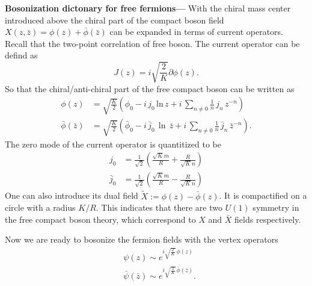 \documentclass[submission, PhysLectNotes]{SciPost}
\begin{document}
{\bf Bosonization dictonary for free fermions---}
With the chiral mass center introduced above the chiral part of the compact boson field $X(z,\bar{z}) = \phi(z) + \bar{\phi}(\bar{z})$ can be expanded in terms of current operators. Recall that the two-point correlation of free boson. The current operator can be defind as 
\begin{equation}
	J(z) = i\sqrt{\frac{2}{K}}\partial \phi (z).
\end{equation} 
So that the chiral/anti-chiral part of the free compact boson can be written as 
\begin{equation}
	\begin{split}
		\phi(z) &= \sqrt{\frac{K}{2}}\left(\phi_0 -i\,j_0\,\mathrm{ln}\,z + i\,\sum_{n\neq0} \frac{1}{n}\,j_n\,z^{-n}\right) \\
		\bar{\phi}(\bar{z}) &= \sqrt{\frac{K}{2}} \left(\bar{\phi}_0 -i\,\bar{j}_0\,\ln \,\bar{z} + i\,\sum_{n\neq0} \frac{1}{n}\,\bar{j}_n\,{\bar{z}}^{-n}\right).
	\end{split}
\end{equation} 
The zero mode of the current operator is quantitized to be 
\begin{equation}
	\begin{aligned}
		j_0 &= \frac{1}{\sqrt{2}} \left( \frac{\sqrt{K}m}{R} + \frac{R}{\sqrt{K}n} \right) \\
		\bar{j}_0 &= \frac{1}{\sqrt{2}} \left( \frac{\sqrt{K}m}{R} - \frac{R}{\sqrt{K}n} \right)
	\end{aligned}
\end{equation}
One can also introduce its dual field $\tilde{X} := \phi(z) - \bar{\phi}(z)$. It is compactified on a circle with a radius $K/R$. This indicates that there are two $U(1)$ symmetry in the free compact boson theory, which correspond to $X$ and $\bar{X}$ fields respectively.

Now we are ready to bosonize the fermion fields with the vertex operators
\begin{equation}
	\begin{split}
		&\psi(z) \sim e^{i\sqrt{\frac{2}{K}}\,\phi(z)} \\
		&\bar{\psi}(\bar{z}) \sim e^{i\sqrt{\frac{2}{K}}\,\bar{\phi}(\bar{z})}.
	\end{split}
\end{equation}
\end{document}
